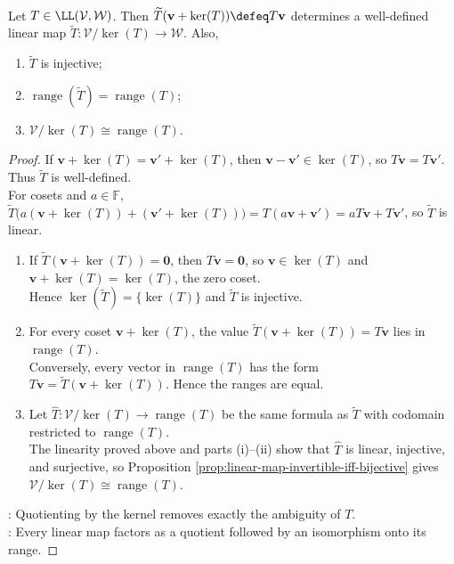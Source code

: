 \begin{theorem} \label{thm:first-isomorphism-theorem-vector-spaces} \label{thm:quotient-by-kernel-is-range} \\
Let $T\in\LL(\mathcal{V},\mathcal{W})$. Then $\widetilde{T}(\mathbf{v}+\ker(T))\defeq T\mathbf{v}$ determines a well-defined linear map $\widetilde{T}:\mathcal{V}/\ker(T)\to\mathcal{W}$. Also,
\begin{enumerate}[label=(\roman*)]
\setlength{\itemsep}{0pt}
\item $\widetilde{T}$ is injective;
\item $\operatorname{range}(\widetilde{T})=\operatorname{range}(T)$;
\item $\mathcal{V}/\ker(T)\cong\operatorname{range}(T)$.
\end{enumerate}
\begin{proof}
If $\mathbf{v}+\ker(T)=\mathbf{v}'+\ker(T)$, then $\mathbf{v}-\mathbf{v}'\in\ker(T)$, so $T\mathbf{v}=T\mathbf{v}'$. Thus $\widetilde{T}$ is well-defined.\\
For cosets and $a\in\mathbb{F}$, $\widetilde{T}\big(a(\mathbf{v}+\ker(T))+(\mathbf{v}'+\ker(T))\big) =T(a\mathbf{v}+\mathbf{v}') =aT\mathbf{v}+T\mathbf{v}'$, so $\widetilde{T}$ is linear.
\begin{enumerate}[label=(\roman*)]
\setlength{\itemsep}{0pt}
\item If $\widetilde{T}(\mathbf{v}+\ker(T))=\mathbf{0}$, then $T\mathbf{v}=\mathbf{0}$, so $\mathbf{v}\in\ker(T)$ and $\mathbf{v}+\ker(T)=\ker(T)$, the zero coset.\\
Hence $\ker(\widetilde{T})=\{\ker(T)\}$ and $\widetilde{T}$ is injective.
\item For every coset $\mathbf{v}+\ker(T)$, the value $\widetilde{T}(\mathbf{v}+\ker(T))=T\mathbf{v}$ lies in $\operatorname{range}(T)$.\\
Conversely, every vector in $\operatorname{range}(T)$ has the form $T\mathbf{v}=\widetilde{T}(\mathbf{v}+\ker(T))$. Hence the ranges are equal.
\item Let $\widehat{T}:\mathcal{V}/\ker(T)\to\operatorname{range}(T)$ be the same formula as $\widetilde{T}$ with codomain restricted to $\operatorname{range}(T)$.\\
The linearity proved above and parts (i)--(ii) show that $\widehat{T}$ is linear, injective, and surjective, so Proposition \ref{prop:linear-map-invertible-iff-bijective} gives $\mathcal{V}/\ker(T)\cong\operatorname{range}(T)$.
\end{enumerate}
: Quotienting by the kernel removes exactly the ambiguity of $T$.\\
: Every linear map factors as a quotient followed by an isomorphism onto its range.
\end{proof}
\end{theorem}

